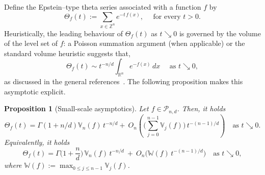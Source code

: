 \documentclass[11pt]{article}
\newtheorem{proposition}[theorem]{Proposition}
\theoremstyle{definition}
\numberwithin{equation}{section}
\newcommand{\cP}{\mathcal{P}}        %
\newcommand{\opV}{\mathds{V}}       %
\begin{document}
Define the Epstein–type theta series associated with a function $f$ by
\[
  \Theta_f(t) := \sum_{x \in \mathbb{Z}^n} e^{-t\,f(x)}, \quad \text{ for every } t > 0.
\]
Heuristically, the leading behaviour of $\Theta_f(t)$ as $t \searrow 0$
is governed by the volume of the level set of $f$:
a Poisson summation argument (when applicable) or the standard volume heuristic suggests that, 
\[
  \Theta_f(t)
  \sim t^{-n/d} 
  \int_{\mathbb{R}^n} e^{-f(x)}\,dx \quad \text{ as $t \searrow 0$},
\]
as discussed in the general references~\cite{Kratzel1989,Huxley1996}.
The following proposition makes this asymptotic explicit.

\begin{proposition}[Small-scale asymptotics]\label{prop:theta}
Let $f\in\cP_{n,d}$. 
Then, it holds
\[
  \Theta_f(t) =
  \Gamma(1 + n/d) \opV_n(f)\,t^{-n/d}
  +\ O_n\!\left(\Big(\sum_{j=0}^{n-1}\opV_j(f)\Big)\,t^{-(n-1)/d}\right) \quad \text{as $t \searrow 0$}.
\]
Equivalently, it holds
\[
\Theta_f(t)=\Gamma\!\Big(1+\frac{n}{d}\Big)\,\opV_n(f)\,t^{-n/d}
\ +\ O_n\!\big(\mathds W(f)\,t^{-(n-1)/d}\big) \quad \text{as $t \searrow 0$},
\]
where $\mathds W(f):=\max_{0\le j\le n-1}\opV_j(f)$.
\end{proposition}
\end{document}
